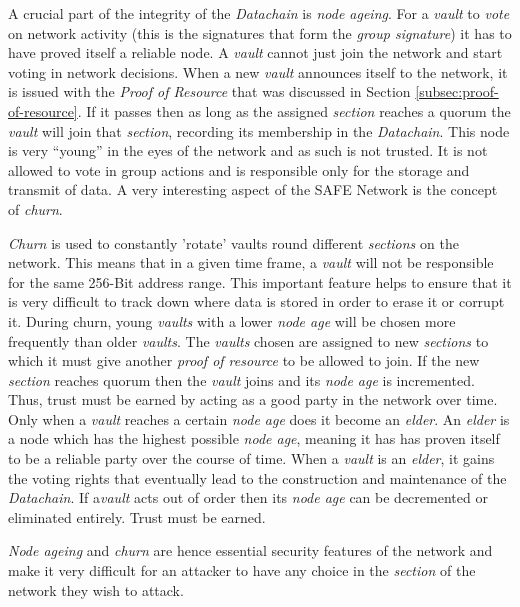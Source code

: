 A crucial part of the integrity of the \textit{Datachain} is \textit{node ageing}. For a \textit{vault} to \textit{vote} on network activity (this is the signatures that form the \textit{group signature}) it has to have proved itself a reliable node. A \textit{vault} cannot just join the network and start voting in network decisions. When a new \textit{vault} announces itself to the network, it is issued with the \textit{Proof of Resource} that was discussed in Section \ref{subsec:proof-of-resource}. If it passes then as long as the assigned \textit{section} reaches a quorum the \textit{vault} will join that \textit{section}, recording its membership in the \textit{Datachain}. This node is very ``young'' in the eyes of the network and as such is not trusted. It is not allowed to vote in group actions and is responsible only for the storage and transmit of data. A very interesting aspect of the SAFE Network is the concept of \textit{churn}. 

\textit{Churn} is used to constantly 'rotate' vaults round different \textit{sections} on the network. This means that in a given time frame, a \textit{vault} will not be responsible for the same 256-Bit address range. This important feature helps to ensure that it is very difficult to track down where data is stored in order to erase it or corrupt it. During churn, young \textit{vaults} with a lower \textit{node age} will be chosen more frequently than older \textit{vaults}. The \textit{vaults} chosen are assigned to new \textit{sections} to which it must give another \textit{proof of resource} to be allowed to join. If the new \textit{section} reaches quorum then the \textit{vault} joins and its \textit{node age} is incremented. Thus, trust must be earned by acting as a good party in the network over time. Only when a \textit{vault} reaches a certain \textit{node age} does it become an \textit{elder}. An \textit{elder} is a node which has the highest possible \textit{node age}, meaning it has has proven itself to be a reliable party over the course of time. When a \textit{vault} is an \textit{elder}, it gains the voting rights that eventually lead to the construction and maintenance of the \textit{Datachain}. If a\textit{vault} acts out of order then its \textit{node age} can be decremented or eliminated entirely. Trust must be earned.

\textit{Node ageing} and \textit{churn} are hence essential security features of the network and make it very difficult for an attacker to have any choice in the \textit{section} of the network they wish to attack.

